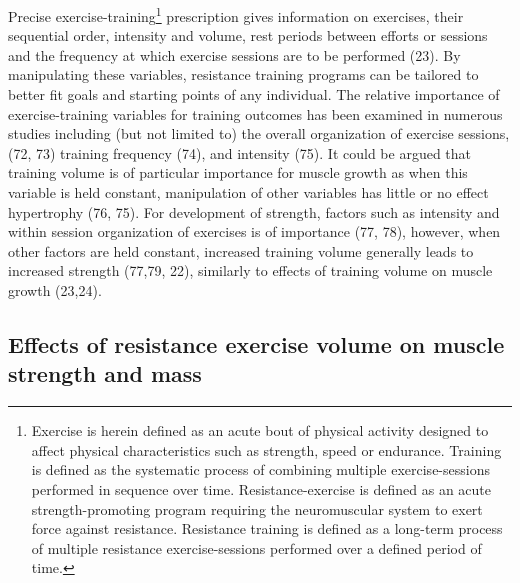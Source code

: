 \documentclass[twoside,10pt]{gihclass} %
\begin{document}
Precise exercise-training\footnote{Exercise is herein defined as an acute bout of physical activity designed to affect physical characteristics such as strength, speed or endurance. Training is defined as the systematic process of combining multiple exercise-sessions performed in sequence over time. Resistance-exercise is defined as an acute strength-promoting program requiring the neuromuscular system to exert force against resistance. Resistance training is defined as a long-term process of multiple resistance exercise-sessions performed over a defined period of time.}
prescription gives information on exercises, their sequential order, intensity and volume, rest periods between efforts or sessions and the frequency at which exercise sessions are to be performed
(23).
By manipulating these variables, resistance training programs can be tailored to better fit goals and starting points of any individual.
The relative importance of exercise-training variables for training outcomes has been examined in numerous studies including (but not limited to) the overall organization of exercise sessions,
(72, 73)
training frequency
(74),
and intensity
(75).
It could be argued that training volume is of particular importance for muscle growth as when this variable is held constant, manipulation of other variables has little or no effect hypertrophy
(76, 75).
For development of strength, factors such as intensity and within session organization of exercises is of importance
(77, 78),
however, when other factors are held constant, increased training volume generally leads to increased strength
(77,79, 22),
similarly to effects of training volume on muscle growth
(23,24).

\hypertarget{effects-of-resistance-exercise-volume-on-muscle-strength-and-mass}{%
\subsection{Effects of resistance exercise volume on muscle strength and mass}\label{effects-of-resistance-exercise-volume-on-muscle-strength-and-mass}}
\end{document}
